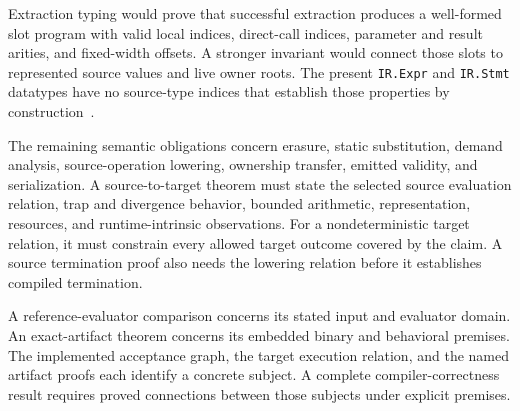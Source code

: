 \documentclass[11pt]{article}
\newcommand{\code}[1]{\texttt{#1}}
\begin{document}
Extraction typing would prove that successful extraction produces a well-formed slot program with valid local indices, direct-call indices, parameter and result arities, and fixed-width offsets.  A stronger invariant would connect those slots to represented source values and live owner roots.  The present \code{IR.Expr} and \code{IR.Stmt} datatypes have no source-type indices that establish those properties by construction~\cite{ir}.

The remaining semantic obligations concern erasure, static substitution, demand analysis, source-operation lowering, ownership transfer, emitted validity, and serialization.  A source-to-target theorem must state the selected source evaluation relation, trap and divergence behavior, bounded arithmetic, representation, resources, and runtime-intrinsic observations.  For a nondeterministic target relation, it must constrain every allowed target outcome covered by the claim.  A source termination proof also needs the lowering relation before it establishes compiled termination.

A reference-evaluator comparison concerns its stated input and evaluator domain.  An exact-artifact theorem concerns its embedded binary and behavioral premises.  The implemented acceptance graph, the target execution relation, and the named artifact proofs each identify a concrete subject.  A complete compiler-correctness result requires proved connections between those subjects under explicit premises.
\end{document}
